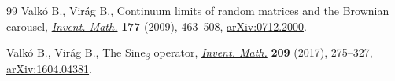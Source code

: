 \documentclass[pdftex]{sigma}
\numberwithin{equation}{section}
\theoremstyle{definition}
\begin{document}
\begin{thebibliography}{99}
Valk\'o B., Vir\'ag B., Continuum limits of random matrices and the {B}rownian
 carousel, \href{https://doi.org/10.1007/s00222-009-0180-z}{\textit{Invent.
 Math.}} \textbf{177} (2009), 463--508,
 \href{http://arxiv.org/abs/0712.2000}{arXiv:0712.2000}.

Valk\'o B., Vir\'ag B., The {Sine$_\beta$} operator,
 \href{https://doi.org/10.1007/s00222-016-0709-x}{\textit{Invent. Math.}}
 \textbf{209} (2017), 275--327,
 \href{http://arxiv.org/abs/1604.04381}{arXiv:1604.04381}.

\end{thebibliography}\LastPageEnding
\end{document}
